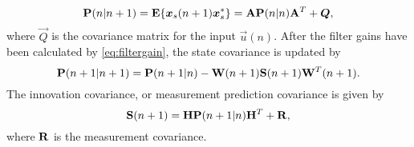 \begin{equation}
\mathbf{P}(n|n+1) = \mathbf{E}\{\bm{x}_s(n+1)\bm{x}^*_s\} = \mathbf{A}\mathbf{P}(n|n)\mathbf{A}^T + \bm{Q}\\,
\end{equation}
where $\vec{Q}$ is the covariance matrix for the input $\vec{u}(n)$. After the filter gains have been calculated by \cref{eq:filtergain}, the state covariance is updated by 
\begin{equation}
	\mathbf{P}(n+1|n+1)  = \mathbf{P}(n+1|n)-\mathbf{W}(n+1)\mathbf{S}(n+1)\mathbf{W}^T(n+1)\\.
\end{equation}
The innovation covariance, or measurement prediction covariance is given by
\begin{equation}\label{eq:innov}
\mathbf{S}(n+1) = \mathbf{H}\mathbf{P}(n+1|n)\mathbf{H}^T +\mathbf{R}\\,
\end{equation}
where $\mathbf{R}$ is the measurement covariance.